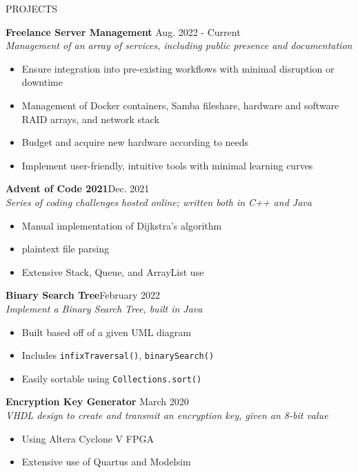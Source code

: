 \documentclass[UTF-8]{resume} \usepackage{multirow}
\begin{document}
\begin{rSection}{PROJECTS}
	\vspace{-1.5em}
    \item \textbf{Freelance Server Management} \hfill {Aug. 2022 - Current}\\
    \emph{Management of an array of services, including public presence and documentation}
	\begin{itemize}
		\itemsep -6pt {}
		\item Ensure integration into pre-existing workflows with minimal disruption or downtime
		\item Management of Docker containers, Samba fileshare, hardware and software RAID arrays, and network stack
		\item Budget and acquire new hardware according to needs
		\item Implement user-friendly, intuitive tools with minimal learning curves
	\end{itemize}
	\item \textbf{Advent of Code 2021}\hfill {Dec. 2021}\\
	\emph{Series of coding challenges hosted online; written both in C++ and Java}
	\begin{itemize}
		\itemsep -6pt {}
		\item Manual implementation of Dijkstra's algorithm
		\item plaintext file parsing
		\item Extensive Stack, Queue, and ArrayList use
	\end{itemize}
	\item \textbf{Binary Search Tree}\hfill {February 2022} \\
	\emph{ Implement a Binary Search Tree, built in Java}
	\begin{itemize}
		\itemsep -6pt {}
		\item Built based off of a given UML diagram
		\item Includes \verb|infixTraversal()|, \verb|binarySearch()|
		\item Easily sortable using \verb|Collections.sort()|
	\end{itemize}
	\item \textbf{Encryption Key Generator} \hfill{March 2020}\\
	\emph{VHDL design to create and transmit an encryption key, given an 8-bit value}
	\begin{itemize}

		\itemsep -6pt {}
		\item Using Altera Cyclone V FPGA
		\item Extensive use of Quartus and Modelsim
	\end{itemize}
\end{rSection}
\end{document}
